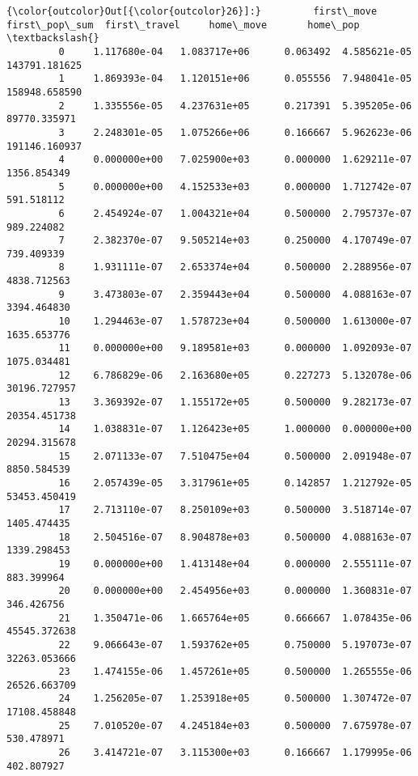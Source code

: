 \documentclass[11pt]{article}
\begin{document}
\begin{Verbatim}[commandchars=\\\{\}]
{\color{outcolor}Out[{\color{outcolor}26}]:}         first\_move  first\_pop\_sum  first\_travel     home\_move       home\_pop  \textbackslash{}
         0     1.117680e-04   1.083717e+06      0.063492  4.585621e-05  143791.181625   
         1     1.869393e-04   1.120151e+06      0.055556  7.948041e-05  158948.658590   
         2     1.335556e-05   4.237631e+05      0.217391  5.395205e-06   89770.335971   
         3     2.248301e-05   1.075266e+06      0.166667  5.962623e-06  191146.160937   
         4     0.000000e+00   7.025900e+03      0.000000  1.629211e-07    1356.854349   
         5     0.000000e+00   4.152533e+03      0.000000  1.712742e-07     591.518112   
         6     2.454924e-07   1.004321e+04      0.500000  2.795737e-07     989.224082   
         7     2.382370e-07   9.505214e+03      0.250000  4.170749e-07     739.409339   
         8     1.931111e-07   2.653374e+04      0.500000  2.288956e-07    4838.712563   
         9     3.473803e-07   2.359443e+04      0.500000  4.088163e-07    3394.464830   
         10    1.294463e-07   1.578723e+04      0.500000  1.613000e-07    1635.653776   
         11    0.000000e+00   9.189581e+03      0.000000  1.092093e-07    1075.034481   
         12    6.786829e-06   2.163680e+05      0.227273  5.132078e-06   30196.727957   
         13    3.369392e-07   1.155172e+05      0.500000  9.282173e-07   20354.451738   
         14    1.038831e-07   1.126423e+05      1.000000  0.000000e+00   20294.315678   
         15    2.071133e-07   7.510475e+04      0.500000  2.091948e-07    8850.584539   
         16    2.057439e-05   3.317961e+05      0.142857  1.212792e-05   53453.450419   
         17    2.713110e-07   8.250109e+03      0.500000  3.518714e-07    1405.474435   
         18    2.504516e-07   8.904878e+03      0.500000  4.088163e-07    1339.298453   
         19    0.000000e+00   1.413148e+04      0.000000  2.555111e-07     883.399964   
         20    0.000000e+00   2.454956e+03      0.000000  1.360831e-07     346.426756   
         21    1.350471e-06   1.665764e+05      0.666667  1.078435e-06   45545.372638   
         22    9.066643e-07   1.593762e+05      0.750000  5.197073e-07   32263.053666   
         23    1.474155e-06   1.457261e+05      0.500000  1.265555e-06   26526.663709   
         24    1.256205e-07   1.253918e+05      0.500000  1.307472e-07   17108.458848   
         25    7.010520e-07   4.245184e+03      0.500000  7.675978e-07     530.478971   
         26    3.414721e-07   3.115300e+03      0.166667  1.179995e-06     402.807927   

\end{Verbatim}
\end{document}
